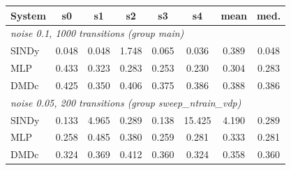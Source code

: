 \begin{tabular}{lccccccc}\toprule
System & s0 & s1 & s2 & s3 & s4 & mean & med. \\\midrule
\multicolumn{8}{l}{\emph{noise 0.1, 1000 transitions (group main)}} \\
SINDy & 0.048 & 0.048 & 1.748 & 0.065 & 0.036 & 0.389 & 0.048 \\
MLP & 0.433 & 0.323 & 0.283 & 0.253 & 0.230 & 0.304 & 0.283 \\
DMDc & 0.425 & 0.350 & 0.406 & 0.375 & 0.386 & 0.388 & 0.386 \\
\midrule
\multicolumn{8}{l}{\emph{noise 0.05, 200 transitions (group sweep\_ntrain\_vdp)}} \\
SINDy & 0.133 & 4.965 & 0.289 & 0.138 & 15.425 & 4.190 & 0.289 \\
MLP & 0.258 & 0.485 & 0.380 & 0.259 & 0.281 & 0.333 & 0.281 \\
DMDc & 0.324 & 0.369 & 0.412 & 0.360 & 0.324 & 0.358 & 0.360 \\
\bottomrule\end{tabular}
